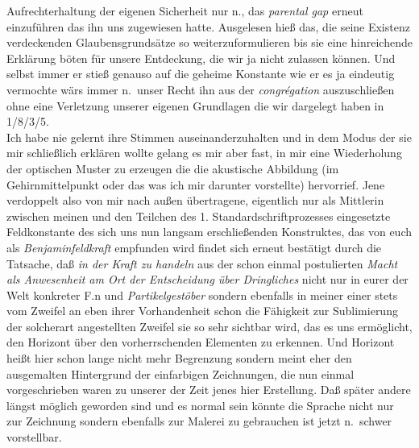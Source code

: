 \documentclass[
]{article}
\begin{document}
Aufrechterhaltung der eigenen Sicherheit nur n., das \emph{parental gap}
erneut einzuführen das ihn uns zugewiesen hatte. Ausgelesen hieß das,
die seine Existenz verdeckenden Glaubensgrundsätze so
weiterzuformulieren bis sie eine hinreichende Erklärung böten für unsere
Entdeckung, die wir ja nicht zulassen können. Und selbst immer er stieß
genauso auf die geheime Konstante wie er es ja eindeutig vermochte wärs
immer n.~unser Recht ihn aus der \emph{congrégation} auszuschließen ohne
eine Verletzung unserer eigenen Grundlagen die wir dargelegt haben in
1/8/3/5.\\
Ich habe nie gelernt ihre Stimmen auseinanderzuhalten und in dem Modus
der sie mir schließlich erklären wollte gelang es mir aber fast, in mir
eine Wiederholung der optischen Muster zu erzeugen die die akustische
Abbildung (im Gehirnmittelpunkt oder das was ich mir darunter
vorstellte) hervorrief. Jene verdoppelt also von mir nach außen
übertragene, eigentlich nur als Mittlerin zwischen meinen und den
Teilchen des 1. Standardschriftprozesses eingesetzte Feldkonstante des
sich uns nun langsam erschließenden Konstruktes, das von euch als
\emph{Benjaminfeldkraft} empfunden wird findet sich erneut bestätigt
durch die Tatsache, daß \emph{in der Kraft zu handeln} aus der schon
einmal postulierten \emph{Macht als Anwesenheit am Ort der Entscheidung
über Dringliches} nicht nur in eurer der Welt konkreter F.n und
\emph{Partikelgestöber} sondern ebenfalls in meiner einer stets vom
Zweifel an eben ihrer Vorhandenheit schon die Fähigkeit zur Sublimierung
der solcherart angestellten Zweifel sie so sehr sichtbar wird, das es
uns ermöglicht, den Horizont über den vorherrschenden Elementen zu
erkennen. Und Horizont heißt hier schon lange nicht mehr Begrenzung
sondern meint eher den ausgemalten Hintergrund der einfarbigen
Zeichnungen, die nun einmal vorgeschrieben waren zu unserer der Zeit
jenes hier Erstellung. Daß später andere längst möglich geworden sind
und es normal sein könnte die Sprache nicht nur zur Zeichnung sondern
ebenfalls zur Malerei zu gebrauchen ist jetzt n.~schwer vorstellbar.
\end{document}

